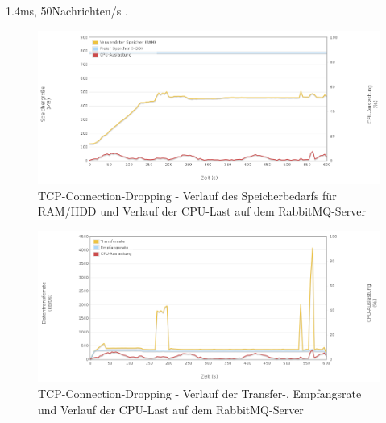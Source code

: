 \documentclass[	a4paper,
			11pt,
			titlepage,
			oneside,
			fleqn,
			listof=totoc,
			parskip,
			numbers=noenddot]{scrartcl}
\begin{document}
	
	\clearpage
		{%
		  \newline
		  \newline
		  \newline
		}{%
		 1.4ms, 50Nachrichten/s
		}{%
		. 
		}
		
		\begin{figure}[!htb]
			\centering
			\includegraphics[width=\textwidth]{img/tcpdrop/tcpdrop_server1.png}
			\caption{TCP-Connection-Dropping - Verlauf des Speicherbedarfs für RAM/HDD und Verlauf der CPU-Last auf dem RabbitMQ-Server}
			\label{fig:tcpdrop-server1}
		\end{figure}
		
		\begin{figure}[!htb]
			\centering
			\includegraphics[width=\textwidth]{img/tcpdrop/tcpdrop_server2.png}
			\caption{TCP-Connection-Dropping - Verlauf der Transfer-, Empfangsrate und Verlauf der CPU-Last auf dem RabbitMQ-Server}
			\label{fig:tcpdrop-server2}
		\end{figure}
		
\end{document}
